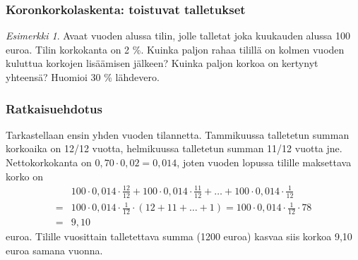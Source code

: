 \documentclass{beamer}\usepackage[]{graphicx}\usepackage[]{color}
\theoremstyle{remark}
\newtheorem{esim}{Esimerkki}
\newtheorem{ratkaisu}{Ratkaisuehdotus}
\begin{document}

\begin{frame}
    \frametitle{Koronkorkolaskenta: toistuvat talletukset}
    \pause
    \begin{esim}
        Avaat vuoden alussa tilin, jolle talletat joka kuukauden alussa 100 euroa.
        Tilin korkokanta on 2 \%. Kuinka paljon rahaa tilillä on kolmen vuoden kuluttua korkojen lisäämisen jälkeen?
        Kuinka paljon korkoa on kertynyt yhteensä? Huomioi 30 \% lähdevero.
    \end{esim}
\end{frame}

\begin{frame}
    \frametitle{Ratkaisuehdotus}
    \pause
        Tarkastellaan ensin yhden vuoden tilannetta. 
        \pause
        Tammikuussa talletetun summan korkoaika on 12/12 vuotta, helmikuussa
        talletetun summan 11/12 vuotta jne. 
        \pause Nettokorkokanta on \(0,70\cdot 0,02 = 0,014\),
        joten vuoden lopussa tilille maksettava korko on 
        \pause
        \begin{align*}
             &100\cdot0,014\cdot\frac{12}{12} + 100\cdot0,014\cdot\frac{11}{12} + \ldots + 100\cdot0,014\cdot\frac{1}{12}\\
            =&100\cdot0,014\cdot\frac{1}{12}\cdot(12+11+\ldots+1) = 100\cdot0,014\cdot\frac{1}{12}\cdot78\\
            =&9,10
        \end{align*}
        euroa. 
        \pause Tilille vuosittain talletettava summa (1200 euroa) kasvaa siis korkoa 9,10 euroa samana vuonna.
\end{frame}
\end{document}
